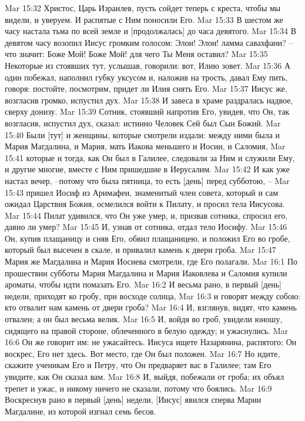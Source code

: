 Mar 15:32  Христос, Царь Израилев, пусть сойдет теперь с креста, чтобы мы видели, и уверуем. И распятые с Ним поносили Его.
Mar 15:33  В шестом же часу настала тьма по всей земле и [продолжалась] до часа девятого.
Mar 15:34  В девятом часу возопил Иисус громким голосом: Элои! Элои! ламма савахфани? --что значит: Боже Мой! Боже Мой! для чего Ты Меня оставил?
Mar 15:35  Некоторые из стоявших тут, услышав, говорили: вот, Илию зовет.
Mar 15:36  А один побежал, наполнил губку уксусом и, наложив на трость, давал Ему пить, говоря: постойте, посмотрим, придет ли Илия снять Его.
Mar 15:37  Иисус же, возгласив громко, испустил дух.
Mar 15:38  И завеса в храме раздралась надвое, сверху донизу.
Mar 15:39  Сотник, стоявший напротив Его, увидев, что Он, так возгласив, испустил дух, сказал: истинно Человек Сей был Сын Божий.
Mar 15:40  Были [тут] и женщины, которые смотрели издали: между ними была и Мария Магдалина, и Мария, мать Иакова меньшего и Иосии, и Саломия,
Mar 15:41  которые и тогда, как Он был в Галилее, следовали за Ним и служили Ему, и другие многие, вместе с Ним пришедшие в Иерусалим.
Mar 15:42  И как уже настал вечер, --потому что была пятница, то есть [день] перед субботою, --
Mar 15:43  пришел Иосиф из Аримафеи, знаменитый член совета, который и сам ожидал Царствия Божия, осмелился войти к Пилату, и просил тела Иисусова.
Mar 15:44  Пилат удивился, что Он уже умер, и, призвав сотника, спросил его, давно ли умер?
Mar 15:45  И, узнав от сотника, отдал тело Иосифу.
Mar 15:46  Он, купив плащаницу и сняв Его, обвил плащаницею, и положил Его во гробе, который был высечен в скале, и привалил камень к двери гроба.
Mar 15:47  Мария же Магдалина и Мария Иосиева смотрели, где Его полагали.
Mar 16:1  По прошествии субботы Мария Магдалина и Мария Иаковлева и Саломия купили ароматы, чтобы идти помазать Его.
Mar 16:2  И весьма рано, в первый [день] недели, приходят ко гробу, при восходе солнца,
Mar 16:3  и говорят между собою: кто отвалит нам камень от двери гроба?
Mar 16:4  И, взглянув, видят, что камень отвален; а он был весьма велик.
Mar 16:5  И, войдя во гроб, увидели юношу, сидящего на правой стороне, облеченного в белую одежду; и ужаснулись.
Mar 16:6  Он же говорит им: не ужасайтесь. Иисуса ищете Назарянина, распятого; Он воскрес, Его нет здесь. Вот место, где Он был положен.
Mar 16:7  Но идите, скажите ученикам Его и Петру, что Он предваряет вас в Галилее; там Его увидите, как Он сказал вам.
Mar 16:8  И, выйдя, побежали от гроба; их объял трепет и ужас, и никому ничего не сказали, потому что боялись.
Mar 16:9  Воскреснув рано в первый [день] недели, [Иисус] явился сперва Марии Магдалине, из которой изгнал семь бесов.
